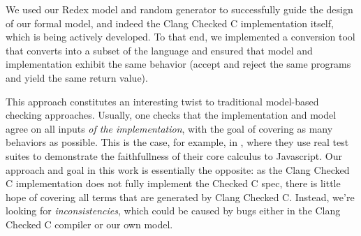 
%
We used our Redex model and random generator to successfully guide the
design of our formal model, and indeed the Clang Checked C
implementation itself, which is being actively developed. To that end, we implemented a
conversion tool that converts \lang into a subset of the \checkedc
language and ensured that model and implementation exhibit the same
behavior (accept and reject the same programs and yield the same return
value).

This approach constitutes an interesting twist to traditional
model-based checking approaches.  Usually, one checks that the
implementation and model agree on all inputs \emph{of the
  implementation}, with the goal of covering as many behaviors as
possible. This is the case, for example, in \citet{lambdajs}, where
they use real test suites to demonstrate the faithfullness of their
core calculus to Javascript. Our approach and goal in this work is
essentially the opposite: as the Clang Checked C implementation does
not fully implement the Checked C spec, there is little hope of
covering all terms that are generated by Clang Checked C. Instead,
we're looking for \emph{inconsistencies}, which could be caused by
bugs either in the Clang Checked C compiler or our own model.  

